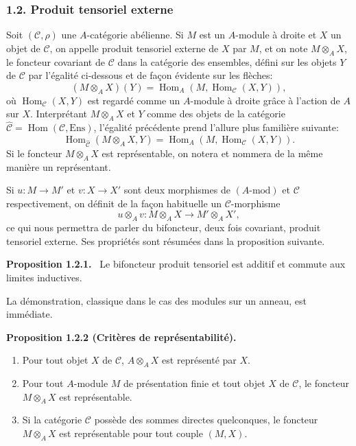 \documentclass[11pt]{article}
\newenvironment{statement}[1]{\par\medskip\noindent\textbf{#1.}\ }{\par\medskip}
\DeclareMathOperator{\Hom}{Hom}
\providecommand{\Hom}{\operatorname{Hom}}
\providecommand{\Ens}{\mathrm{Ens}}
\providecommand{\cC}{\mathcal C}
\providecommand{\Ens}{\operatorname{Ens}}
\providecommand{\cC}{\mathcal C}
\providecommand{\Hom}{\operatorname{Hom}}
\begin{document}
\subsubsection*{1.2. Produit tensoriel externe}
Soit $(\cC,\rho)$ une $A$-catégorie abélienne. Si $M$ est un $A$-module à droite et $X$ un objet de $\cC$, on appelle produit tensoriel externe de $X$ par $M$, et on note $M\otimes_A X$, le foncteur covariant de $\cC$ dans la catégorie des ensembles, défini sur les objets $Y$ de $\cC$ par l'égalité ci-dessous et de façon évidente sur les flèches:
\[
(M\otimes_A X)(Y)=\Hom_A(M,\Hom_{\cC}(X,Y)),
\]
où $\Hom_{\cC}(X,Y)$ est regardé comme un $A$-module à droite grâce à l'action de $A$ sur $X$. Interprétant $M\otimes_AX$ et $Y$ comme des objets de la catégorie $\widehat{\cC}=\Hom(\cC,\Ens)$, l'égalité précédente prend l'allure plus familière suivante:
\[
\Hom_{\widehat{\cC}}(M\otimes_A X,Y)=\Hom_A(M,\Hom_{\cC}(X,Y)).
\]
Si le foncteur $M\otimes_A X$ est représentable, on notera et nommera de la même manière un représentant.

Si $u:M\to M'$ et $v:X\to X'$ sont deux morphismes de $(A\text{-mod})$ et $\cC$ respectivement, on définit de la façon habituelle un $\cC$-morphisme
\[
u\otimes_A v:M\otimes_A X\longrightarrow M'\otimes_A X',
\]
ce qui nous permettra de parler du bifoncteur, deux fois covariant, produit tensoriel externe. Ses propriétés sont résumées dans la proposition suivante.

\begin{statement}{Proposition 1.2.1}
Le bifoncteur produit tensoriel est additif et commute aux limites inductives.
\end{statement}
La démonstration, classique dans le cas des modules sur un anneau, est immédiate.

\begin{statement}{Proposition 1.2.2 (Critères de représentabilité)}
\begin{enumerate}[label=(\alph*)]
\item Pour tout objet $X$ de $\cC$, $A\otimes_AX$ est représenté par $X$.
\item Pour tout $A$-module $M$ de présentation finie et tout objet $X$ de $\cC$, le foncteur $M\otimes_AX$ est représentable.
\item Si la catégorie $\cC$ possède des sommes directes quelconques, le foncteur $M\otimes_A X$ est représentable pour tout couple $(M,X)$.
\end{enumerate}
\end{statement}
\end{document}
